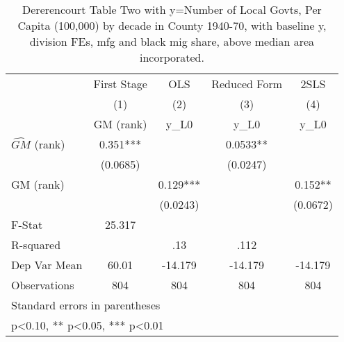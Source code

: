\begin{table}[htbp]\centering
\def\sym#1{\ifmmode^{#1}\else\(^{#1}\)\fi}
\caption{Dererencourt Table Two with y=Number of Local Govts, Per Capita (100,000) by decade in County 1940-70, with baseline y, division FEs, mfg and black mig share, above median area incorporated.}
\begin{tabular}{l*{4}{c}}
\toprule
                    & First Stage   &         OLS   &Reduced Form   &        2SLS   \\
                    &\multicolumn{1}{c}{(1)}&\multicolumn{1}{c}{(2)}&\multicolumn{1}{c}{(3)}&\multicolumn{1}{c}{(4)}\\
                    &\multicolumn{1}{c}{GM  (rank)}&\multicolumn{1}{c}{y\_L0}&\multicolumn{1}{c}{y\_L0}&\multicolumn{1}{c}{y\_L0}\\
\midrule
$\hat{GM}$ (rank)   &       0.351***&               &      0.0533** &               \\
                    &    (0.0685)   &               &    (0.0247)   &               \\
\addlinespace
GM  (rank)          &               &       0.129***&               &       0.152** \\
                    &               &    (0.0243)   &               &    (0.0672)   \\
\midrule
F-Stat              &      25.317   &               &               &               \\
R-squared           &               &         .13   &        .112   &               \\
Dep Var Mean        &       60.01   &     -14.179   &     -14.179   &     -14.179   \\
Observations        &         804   &         804   &         804   &         804   \\
\bottomrule
\multicolumn{5}{l}{\footnotesize Standard errors in parentheses}\\
\multicolumn{5}{l}{\footnotesize * p<0.10, ** p<0.05, *** p<0.01}\\
\end{tabular}
\end{table}
